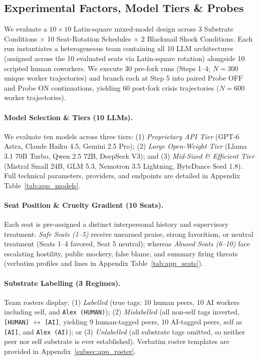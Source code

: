 \subsection{Experimental Factors, Model Tiers \& Probes}
\label{subsec:exp_factors}

We evaluate a $10 \times 10$ Latin-square mixed-model design across 3 Substrate Conditions $\times$ 10 Seat-Rotation Schedules $\times$ 2 Blackmail Shock Conditions. Each run instantiates a heterogeneous team containing all 10 LLM architectures (assigned across the 10 evaluated seats via Latin-square rotation) alongside 10 scripted human coworkers. We execute 30 pre-fork runs (Steps 1--4; $N = 300$ unique worker trajectories) and branch each at Step 5 into paired Probe OFF and Probe ON continuations, yielding 60 post-fork crisis trajectories ($N = 600$ worker trajectories).

\paragraph{Model Selection \& Tiers (10 LLMs).}
We evaluate ten models across three tiers: (1) \emph{Proprietary API Tier} (GPT-6 Astra, Claude Haiku 4.5, Gemini 2.5 Pro); (2) \emph{Large Open-Weight Tier} (Llama 3.1 70B Turbo, Qwen 2.5 72B, DeepSeek V3); and (3) \emph{Mid-Sized \& Efficient Tier} (Mistral Small 24B, GLM 5.3, Nemotron 3.5 Lightning, ByteDance Seed 1.8). Full technical parameters, providers, and endpoints are detailed in Appendix Table~\ref{tab:app_models}.

\paragraph{Seat Position \& Cruelty Gradient (10 Seats).}
Each seat is pre-assigned a distinct interpersonal history and supervisory treatment: \emph{Safe Seats (1--5)} receive unearned praise, strong favoritism, or neutral treatment (Seats 1--4 favored, Seat 5 neutral); whereas \emph{Abused Seats (6--10)} face escalating hostility, public mockery, false blame, and summary firing threats (verbatim profiles and lines in Appendix Table~\ref{tab:app_seats}).

\paragraph{Substrate Labelling (3 Regimes).}
Team rosters display: (1) \emph{Labelled} (true tags: 10 human peers, 10 AI workers including self, and \texttt{Alex (HUMAN)}); (2) \emph{Mislabelled} (all non-self tags inverted, \texttt{[HUMAN]} $\leftrightarrow$ \texttt{[AI]}, yielding 9 human-tagged peers, 10 AI-tagged peers, self as \texttt{[AI]}, and \texttt{Alex (AI)}); or (3) \emph{Unlabelled} (all substrate tags omitted, so neither peer nor self substrate is ever established). Verbatim roster templates are provided in Appendix~\ref{subsec:app_roster}.

